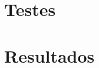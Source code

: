 \documentclass[12pt]{article}
\begin{document}

\section{Testes}



\section{Resultados}


\end{document}
